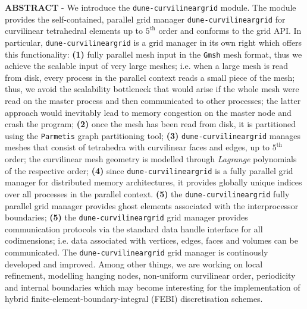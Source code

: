 \documentclass[12pt]{report}
\begin{document}
\begin{titlepage}
\noindent \textbf{\textsc{ABSTRACT}} - We introduce the \texttt{dune-curvilineargrid} module. The module provides the self-contained, parallel
grid manager \texttt{dune-curvilineargrid} for curvilinear tetrahedral elements up to $5^{\mathrm{th}}$  order and conforms to the  grid API.
In particular, \texttt{dune-curvilineargrid} is a grid manager in its own right which offers this functionality:
\textbf{(1)} fully parallel mesh input in the \texttt{Gmsh} mesh format, thus we achieve the scalable input of very large meshes;
i.e. when a large mesh is read from disk, every process in the parallel context reads a small piece of the mesh; thus, we avoid the
scalability bottleneck that would arise if the whole mesh were read on the master process and then communicated to other processes;
the latter approach would inevitably lead to memory congestion on the master node and crash the program;
\textbf{(2)} once the mesh has been read from disk, it is partitioned using the \texttt{Parmetis} graph partitioning tool;
\textbf{(3)} \texttt{dune-curvilineargrid} manages meshes that consist of tetrahedra with curvilinear faces and edges, up to
$5^{\mathrm{th}}$ order; the curvilinear mesh geometry is modelled through \textit{Lagrange} polynomials of the respective order;
\textbf{(4)} since \texttt{dune-curvilineargrid} is a fully parallel grid manager for distributed memory architectures, it provides
globally unique indices over all processes in the parallel context.
\textbf{(5)} the \texttt{dune-curvilineargrid} fully parallel grid manager provides ghost elements associated with the interprocessor
boundaries;
\textbf{(5)} the \texttt{dune-curvilineargrid} grid manager provides communication protocols via the standard
 data handle interface for all codimensions; i.e. data associated with vertices, edges, faces and volumes can
be communicated.
The \texttt{dune-curvilineargrid} grid manager is continously developed and improved. Among other things, we are working
on local refinement, modelling hanging nodes, non-uniform curvilinear order, periodicity and internal boundaries which
may become interesting for the implementation of hybrid finite-element-boundary-integral (FEBI) discretisation schemes.










\end{titlepage}
\end{document}
